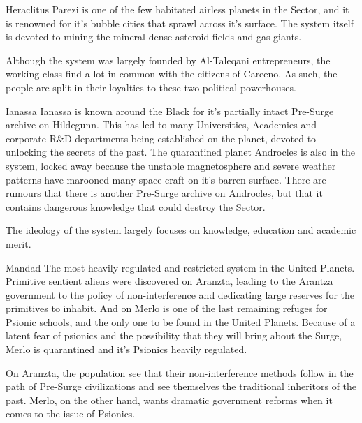 \begin{multicols}{2}
  \begin{genericsection}{Heraclitus}
  Parezi is one of the few habitated airless planets in the Sector, and it is renowned for it's bubble cities that sprawl across it's surface. The system itself is devoted to mining the mineral dense asteroid fields and gas giants. 
  
  Although the system was largely founded by Al-Taleqani entrepreneurs, the working class find a lot in common with the citizens of Careeno. As such, the people are split in their loyalties to these two political powerhouses.
  \end{genericsection}
  
  \begin{genericsection}{Ianassa}
  Ianassa is known around the Black for it's partially intact Pre-Surge archive on Hildegunn. This has led to many Universities, Academies and corporate R\&D departments being established on the planet, devoted to unlocking the secrets of the past. The quarantined planet Androcles is also in the system, locked away because the unstable magnetosphere and severe weather patterns have marooned many space craft on it's barren surface. There are rumours that there is another Pre-Surge archive on Androcles, but that it contains dangerous knowledge that could destroy the Sector.
  
  The ideology of the system largely focuses on knowledge, education and academic merit.
  \end{genericsection}
  
  \begin{genericsection}{Mandad}
  The most heavily regulated and restricted system in the United Planets. Primitive sentient aliens were discovered on Aranzta, leading to the Arantza government to the policy of non-interference and dedicating large reserves for the primitives to inhabit. And on Merlo is one of the last remaining refuges for Psionic schools, and the only one to be found in the United Planets. Because of a latent fear of psionics and the possibility that they will bring about the Surge, Merlo is quarantined and it's Psionics heavily regulated.
  
  On Aranzta, the population see that their non-interference methods follow in the path of Pre-Surge civilizations and see themselves the traditional inheritors of the past. Merlo, on the other hand, wants dramatic government reforms when it comes to the issue of Psionics.
  \end{genericsection}
  

\end{multicols}
